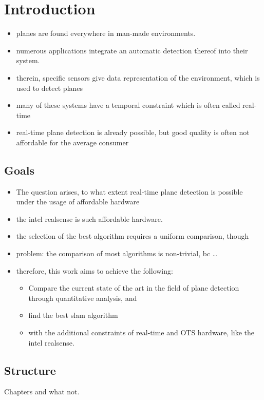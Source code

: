 \documentclass[main.tex]{subfiles}
\begin{document}
\chapter{Introduction}
\label{chap:Introduction}

\begin{itemize}
    \item planes are found everywhere in man-made environments.
    \item numerous applications integrate an automatic detection thereof into their system.
    \item therein, specific sensors give data representation of the environment, which is used to detect planes
    \item many of these systems have a temporal constraint which is often called real-time
    \item real-time plane detection is already possible, but good quality is often not affordable for the average consumer
\end{itemize}

\section{Goals}
\begin{itemize}
    \item The question arises, to what extent real-time plane detection is possible under the usage of affordable hardware
    \item the intel realsense is such affordable hardware.
    \item the selection of the best algorithm requires a uniform comparison, though
    \item problem: the comparison of most algorithms is non-trivial, bc …
    \item therefore, this work aims to achieve the following:
    \begin{itemize}
        \item Compare the current state of the art in the field of plane detection through quantitative analysis, and 
        \item find the best slam algorithm 
        \item with the additional constraints of real-time and OTS hardware, like the intel realsense.
    \end{itemize}  
\end{itemize}

\section{Structure}
Chapters and what not.
\end{document}
